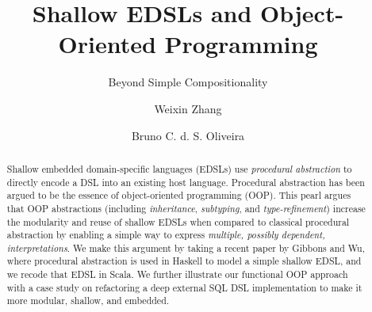 \documentclass[english,submission]{programming}
\begin{document}
\title{Shallow EDSLs and Object-Oriented Programming}
\subtitle{Beyond Simple Compositionality}

\author[a]{Weixin Zhang}
\author[a]{Bruno C. d. S. Oliveira}


\maketitle

\begin{abstract}
Shallow embedded domain-specific languages (EDSLs) use
\emph{procedural abstraction} to directly encode a DSL into an
existing host language. Procedural abstraction has 
been argued to be the essence of object-oriented programming (OOP).
This pearl argues that OOP abstractions
(including \emph{inheritance}, \emph{subtyping}, and
\emph{type-refinement})
increase the modularity and reuse of shallow
EDSLs when compared to classical procedural abstraction by enabling a
simple way to express \emph{multiple, possibly dependent, interpretations}. We make this
argument by taking a recent paper by Gibbons and Wu, where procedural
abstraction is used in Haskell to model a simple shallow EDSL, and we recode
that EDSL in Scala. 
We further illustrate our functional OOP approach with
a case study on refactoring a deep external SQL DSL implementation to make it
more modular, shallow, and embedded.
\end{abstract}


















\end{document}
